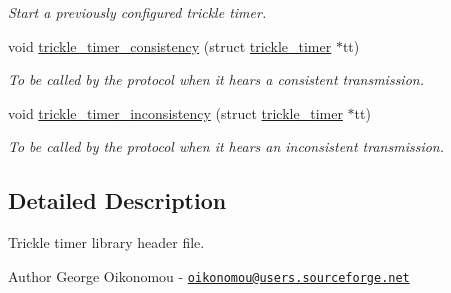 \begin{DoxyCompactItemize}
\begin{DoxyCompactList}\small\item\em Start a previously configured trickle timer. \end{DoxyCompactList}\item 
void \hyperlink{group__trickle-timer_gaf7df1a3da4f9be5e2f17c3b77668eb6e}{trickle\+\_\+timer\+\_\+consistency} (struct \hyperlink{structtrickle__timer}{trickle\+\_\+timer} $\ast$tt)
\begin{DoxyCompactList}\small\item\em To be called by the protocol when it hears a consistent transmission. \end{DoxyCompactList}\item 
void \hyperlink{group__trickle-timer_gae401435f40030c5c4f0f49e813fd9afc}{trickle\+\_\+timer\+\_\+inconsistency} (struct \hyperlink{structtrickle__timer}{trickle\+\_\+timer} $\ast$tt)
\begin{DoxyCompactList}\small\item\em To be called by the protocol when it hears an inconsistent transmission. \end{DoxyCompactList}\end{DoxyCompactItemize}


\subsection{Detailed Description}
Trickle timer library header file.

\begin{DoxyAuthor}{Author}
George Oikonomou -\/ \href{mailto:oikonomou@users.sourceforge.net}{\tt oikonomou@users.\+sourceforge.\+net} 
\end{DoxyAuthor}
